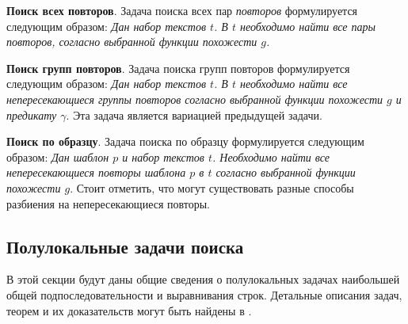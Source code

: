\textbf{Поиск всех повторов}.
Задача поиска всех пар \emph{повторов} формулируется следующим образом: \emph{Дан набор текстов $t$. В $t$ необходимо найти все пары повторов,  согласно выбранной функции похожести $g$.
}

\textbf{Поиск групп повторов}.
Задача поиска групп повторов формулируется следующим образом:
\emph{Дан набор  текстов $t$. В $t$ необходимо найти все непересекающиеся группы повторов согласно выбранной функции похожести $g$ и предикату $\gamma$}.
Эта задача является вариацией предыдущей задачи.

\textbf{Поиск по образцу}.
Задача поиска по образцу формулируется следующим образом:
\emph{Дан шаблон $p$ и набор текстов $t$. Необходимо найти все непересекающиеся повторы шаблона $p$ в  $t$ согласно выбранной функции похожести $g$}. Стоит отметить, что могут существовать разные способы разбиения на непересекающиеся повторы.














\subsection{Полулокальные задачи поиска}

В этой секции будут даны общие сведения о полулокальных задачах наибольшей общей подпоследовательности и выравнивания строк.
Детальные описания задач, теорем и их доказательств могут быть найдены в  \cite{alex2007semilocal}.

